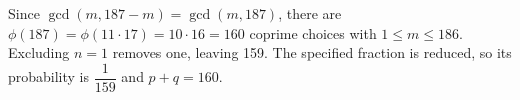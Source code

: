 Since $\gcd(m,187-m)=\gcd(m,187)$, there are $\phi(187)=\phi(11\cdot17)=10\cdot16=160$ coprime choices with $1\le m\le186$. Excluding $n=1$ removes one, leaving 159. The specified fraction is reduced, so its probability is $\dfrac{1}{159}$ and $\boxed{p+q=160}$.
